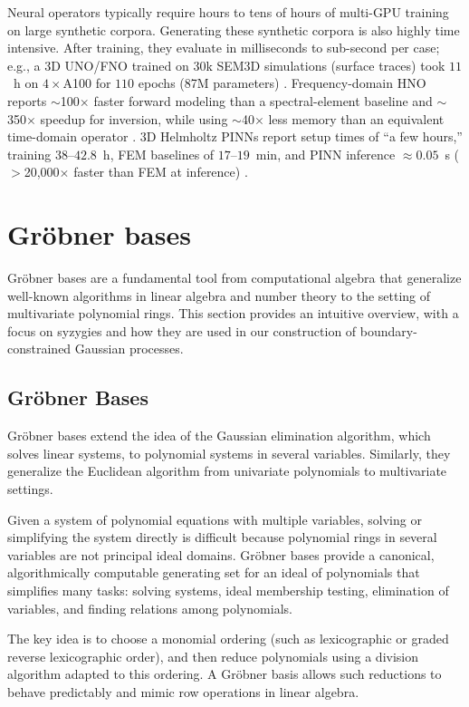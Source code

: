 \documentclass{article} %
\theoremstyle{plain}
\theoremstyle{definition}
\theoremstyle{remark}
\begin{document}
Neural operators typically require hours to tens of hours of multi-GPU training on large synthetic corpora. Generating these synthetic corpora is also highly time intensive.
After training, they evaluate in milliseconds to sub-second per case; e.g., a 3D UNO/FNO trained on 30k SEM3D simulations (surface traces) took \(11\)~h on \(4\times\)A100 for \(110\) epochs (87M parameters) \citep{Lehmann2023UNO}. Frequency-domain HNO reports \(\sim\)100\(\times\) faster forward modeling than a spectral-element baseline and \(\sim\)350\(\times\) speedup for inversion, while using \(\sim\)40\(\times\) less memory than an equivalent time-domain operator \citep{Zou2024HNO}. 3D Helmholtz PINNs report setup times of ``a few hours,'' training \(38\)--\(42.8\)~h, FEM baselines of \(17\)--\(19\)~min, and PINN inference \(\approx 0.05\)~s (\(>\)20{,}000\(\times\) faster than FEM at inference) \citep{Schoder2024PINN}.

\section{Gröbner bases}
\label{sec:appendix_groebner}

Gröbner bases are a fundamental tool from computational algebra that generalize well-known algorithms in linear algebra and number theory to the setting of multivariate polynomial rings. This section provides an intuitive overview, with a focus on syzygies and how they are used in our construction of boundary-constrained Gaussian processes.

\subsection{Gröbner Bases}

Gröbner bases extend the idea of the Gaussian elimination algorithm, which solves linear systems, to polynomial systems in several variables. Similarly, they generalize the Euclidean algorithm from univariate polynomials to multivariate settings.

Given a system of polynomial equations with multiple variables, solving or simplifying the system directly is difficult because polynomial rings in several variables are not principal ideal domains. Gröbner bases provide a canonical, algorithmically computable generating set for an ideal of polynomials that simplifies many tasks: solving systems, ideal membership testing, elimination of variables, and finding relations among polynomials.

The key idea is to choose a monomial ordering (such as lexicographic or graded reverse lexicographic order), and then reduce polynomials using a division algorithm adapted to this ordering. A Gröbner basis allows such reductions to behave predictably and mimic row operations in linear algebra.
\end{document}
